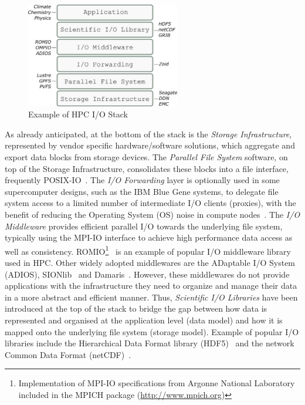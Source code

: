 \begin{figure}[!htb]
  \centering
  \includegraphics[width=0.6\textwidth]{chapters/figures/hpc-io-stack}
  \caption{Example of HPC I/O Stack}
  \label{figure: hpc-io-stack}
\end{figure}

As already anticipated, at the bottom of the stack is the \textit{Storage Infrastructure}, represented by vendor specific hardware/software solutions, which aggregate and export data blocks from storage devices. 
The \textit{Parallel File System} software, on top of the Storage Infrastructure, consolidates these blocks into a file interface, frequently POSIX-IO~\cite{POSIX}. The \textit{I/O Forwarding} layer is optionally used 
in some supercomputer designs, such as the IBM Blue Gene systems, to delegate file system access to a limited number of intermediate I/O clients (proxies), with the benefit of reducing the Operating System (OS) 
noise in compute nodes~\cite{AliCIKLLRWS09}. The \textit{I/O Middleware} provides efficient parallel I/O towards the underlying file system, typically using the MPI-IO interface to achieve high performance data access 
as well as consistency. ROMIO\footnote{Implementation of MPI-IO specifications from Argonne National Laboratory included in the MPICH package (\url{http://www.mpich.org})}~\cite{ThakurGL99} is an example of popular I/O 
middleware library used in HPC. Other widely adopted middlewares are the ADaptable I/O System~\cite{CPE:CPE3125} (ADIOS), SIONlib~\cite{sionlib} and Damaris~\cite{DorierACSO12}. However, these middlewares do not provide applications 
with the infrastructure they need to organize and manage their data in a more abstract and efficient manner. Thus, \textit{Scientific I/O Libraries} have been introduced at the top of the stack to bridge the gap between how 
data is represented and organised at the application level (data model) and how it is mapped onto the underlying file system (storage model). Example of popular I/O libraries include the Hierarchical Data Format library 
(HDF5)~\cite{carlosmalt:folk:sc99} and the network Common Data Format (netCDF)~\cite{1592942}.

